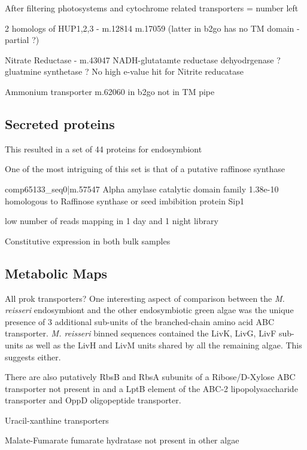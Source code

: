 After filtering photosystems and cytochrome related transporters = number left


2 homologs of HUP1,2,3 - m.12814 m.17059 (latter in b2go has no TM domain - partial ?)


Nitrate Reductase - m.43047  
NADH-glutatamte reductase dehyodrgenase ?
gluatmine synthetase ?
No high e-value hit for Nitrite reducatase

Ammonium transporter m.62060 in b2go not in TM pipe






\subsection{Secreted proteins}

This resulted in a set of 44 proteins for endosymbiont 




One of the most intriguing of this set is that
of a putative raffinose synthase


comp65133\_seq0|m.57547 Alpha amylase catalytic domain family
1.38e-10
homologous to Raffinose synthase or seed imbibition protein Sip1


low number of reads mapping in 1 day and 1 night library

Constitutive expression in both bulk samples 

\subsection{Metabolic Maps}



All prok transporters?
One interesting aspect of comparison between the \textit{M. reisseri}
endosymbiont and the other endosymbiotic green algae was the unique presence of 3
additional sub-units of the branched-chain amino acid ABC transporter.
\textit{M. reisseri} binned sequences contained the LivK, LivG, LivF sub-units
as well as the LivH and LivM units shared by all the remaining algae. 
This suggests either. 

There are also putatively RbsB and RbsA subunits of a Ribose/D-Xylose
ABC transporter not present in 
and a LptB element of the ABC-2 lipopolysaccharide transporter
and OppD oligopeptide transporter.


Uracil-xanthine transporters




Malate-Fumarate fumarate hydratase not present in other algae





